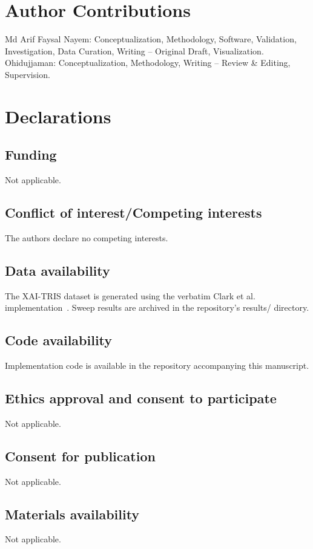 \documentclass[pdflatex,sn-mathphys-num]{sn-jnl}
\theoremstyle{thmstyleone}
\theoremstyle{thmstyletwo}%
\theoremstyle{thmstylethree}%
\begin{document}
\section*{Author Contributions}
Md Arif Faysal Nayem: Conceptualization, Methodology, Software, Validation, Investigation, Data Curation, Writing -- Original Draft, Visualization. Ohidujjaman: Conceptualization, Methodology, Writing -- Review \& Editing, Supervision.

\section*{Declarations}

\subsection*{Funding}
Not applicable.

\subsection*{Conflict of interest/Competing interests}
The authors declare no competing interests.

\subsection*{Data availability}
The XAI-TRIS dataset is generated using the verbatim Clark et al. implementation~\cite{clark2024}. Sweep results are archived in the repository's results/ directory.

\subsection*{Code availability}
Implementation code is available in the repository accompanying this manuscript.

\subsection*{Ethics approval and consent to participate}
Not applicable.

\subsection*{Consent for publication}
Not applicable.

\subsection*{Materials availability}
Not applicable.
\end{document}
